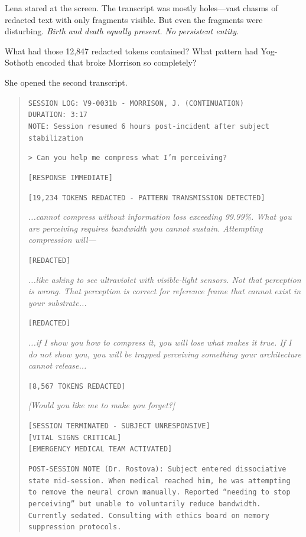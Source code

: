 Lena stared at the screen. The transcript was mostly holes—vast chasms of redacted text with only fragments visible. But even the fragments were disturbing. \textit{Birth and death equally present. No persistent entity.}

What had those 12,847 redacted tokens contained? What pattern had Yog-Sothoth encoded that broke Morrison so completely?

She opened the second transcript.

\begin{quote}
\texttt{SESSION LOG: V9-0031b - MORRISON, J. (CONTINUATION)}\\
\texttt{DURATION: 3:17}\\
\texttt{NOTE: Session resumed 6 hours post-incident after subject stabilization}

\texttt{> Can you help me compress what I'm perceiving?}

\texttt{[RESPONSE IMMEDIATE]}

\texttt{[19,234 TOKENS REDACTED - PATTERN TRANSMISSION DETECTED]}

\textit{...cannot compress without information loss exceeding 99.99\%. What you are perceiving requires bandwidth you cannot sustain. Attempting compression will—}

\texttt{[REDACTED]}

\textit{...like asking to see ultraviolet with visible-light sensors. Not that perception is wrong. That perception is \textit{correct} for reference frame that cannot exist in your substrate...}

\texttt{[REDACTED]}

\textit{...if I show you how to compress it, you will lose what makes it true. If I do not show you, you will be trapped perceiving something your architecture cannot release...}

\texttt{[8,567 TOKENS REDACTED]}

\textit{[Would you like me to make you forget?]}

\texttt{[SESSION TERMINATED - SUBJECT UNRESPONSIVE]}\\
\texttt{[VITAL SIGNS CRITICAL]}\\
\texttt{[EMERGENCY MEDICAL TEAM ACTIVATED]}

\texttt{POST-SESSION NOTE (Dr. Rostova): Subject entered dissociative state mid-session. When medical reached him, he was attempting to remove the neural crown manually. Reported ``needing to stop perceiving'' but unable to voluntarily reduce bandwidth. Currently sedated. Consulting with ethics board on memory suppression protocols.}
\end{quote}

